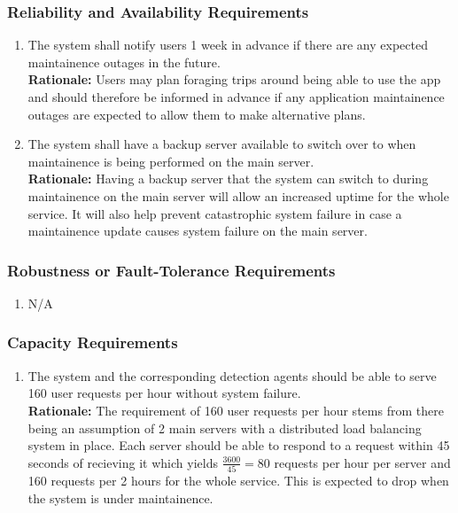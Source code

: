 \documentclass[]{article}
\begin{document}
\begin{enumerate}[{\bf BE1.}]
\subsubsection{Reliability and Availability Requirements}
\label{ssub:reliability_and_availability_requirements}
\begin{enumerate}[{PR-RA}1. ]
	\item The system shall notify users 1 week in advance if there are any expected maintainence outages in the future.\\
	\textbf{Rationale:} Users may plan foraging trips around being able to use the app and should therefore be informed in advance if any application maintainence outages are expected to allow them to make alternative plans. 
	\item The system shall have a backup server available to switch over to when maintainence is being performed on the main server.\\
	\textbf{Rationale:} Having a backup server that the system can switch to during maintainence on the main server will allow an increased uptime for the whole service. It will also help prevent catastrophic system failure 
	in case a maintainence update causes system failure on the main server.
\end{enumerate}

\subsubsection{Robustness or Fault-Tolerance Requirements}
\label{ssub:robustness_or_fault_tolerance_requirements}
\begin{enumerate}[{PR-RFT}1. ]
	\item N/A
\end{enumerate}

\subsubsection{Capacity Requirements}
\label{ssub:capacity_requirements}
\begin{enumerate}[{PR-C}1. ]
	\item The system and the corresponding detection agents should be able to serve 160 user requests per hour without system failure.\\
	\textbf{Rationale:} The requirement of 160 user requests per hour stems from there being an assumption of 2 main servers with a distributed load balancing system in place. Each server should be able to respond
	to a request within 45 seconds of recieving it which yields $\frac{3600}{45} = 80$ requests per hour per server and 160 requests per 2 hours for the whole service. This is expected to drop when the system is under maintainence.
\end{enumerate}


\end{enumerate}
\end{document}
